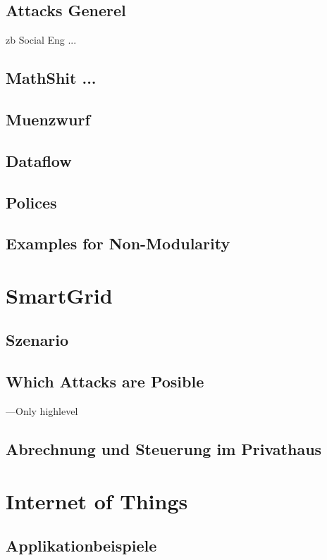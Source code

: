 \documentclass[a4paper, 12pt]{article}
\begin{document}
\subsection{Attacks Generel}
zb Social Eng ...
\subsection{MathShit ...}
\subsection{Muenzwurf}
\subsection{Dataflow}
\subsection{Polices}
\subsection{Examples for Non-Modularity}

\section{SmartGrid}
\subsection{Szenario}
\subsection{Which Attacks are Posible}
---Only highlevel
\subsection{Abrechnung und Steuerung im Privathaus}

\section{Internet of Things}
\subsection{Applikationbeispiele}
\end{document}
